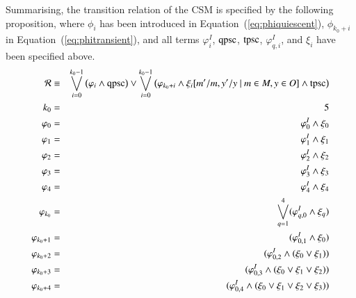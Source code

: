 Summarising, the transition relation of the CSM is specified by the following proposition, where 
$\phi_i$ has been introduced in Equation~(\ref{eq:phiquiescent}),
$\phi_{k_0+i}$ in Equation~(\ref{eq:phitransient}), and
all terms $\varphi_i^I$, $\text{qpsc}$, $\text{tpsc}$, $\varphi_{q,i}^I$, and $\xi_i$ have been specified above.
\footnotesize
\begin{eqnarray}
\label{eq:rcsm}
{\cal R} &\equiv&  \bigvee_{i=0}^{k_0-1}\big(\varphi_i \wedge \text{qpsc}\big) \vee 
\bigvee_{i=0}^{k_0-1}\big(\varphi_{k_0+i} \wedge \xi_i[m'/m,y'/y~|~m\in M, y\in O]\wedge \text{tpsc}\big) 
\\
k_0 & = & 5
\\
\label{eq:phi0}
\varphi_0 & = & \varphi_0^I \wedge \xi_0
\\ 
\varphi_1 & = & \varphi_1^I \wedge \xi_1
\\
\varphi_2 & = & \varphi_2^I \wedge \xi_2
\\
\varphi_3 & = & \varphi_3^I \wedge \xi_3
\\
\label{eq:phi4}
\varphi_4 & = & \varphi_4^I \wedge \xi_4
\\
\varphi_{k_0}& =  &  \bigvee_{q=1}^4(\varphi_{q,0}^I \wedge \xi_q)
\label{eq:phik0}
\\ 
\varphi_{k_0+1}& =  & (\varphi_{0,1}^I \wedge \xi_0)
\\ 
\varphi_{k_0+2}& =  &  (\varphi_{0,2}^I \wedge (\xi_0 \vee \xi_1)) 
\\
\varphi_{k_0+3}& =  &  (\varphi_{0,3}^I \wedge (\xi_0 \vee \xi_1 \vee \xi_2)) 
\\ 
\varphi_{k_0+4}& =  & (\varphi_{0,4}^I \wedge (\xi_0 \vee \xi_1 \vee \xi_2 \vee \xi_3)) 
\label{eq:phik4} 
\end{eqnarray}
\normalsize


 




 
